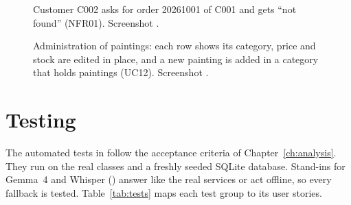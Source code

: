 \begin{figure}[htbp]
\centering
\begin{minipage}[t]{0.485\linewidth}\centering
{}
\caption[Checkout]{Checkout: address, payment method, VIP discount and shipping fee before the order is placed (UC07). Screenshot .}\label{fig:demo_checkout}
\end{minipage}\hfill
\begin{minipage}[t]{0.485\linewidth}\centering
{}
\caption[Order of another customer]{Customer C002 asks for order 20261001 of C001 and gets ``not found'' (NFR01). Screenshot .}\label{fig:demo_order_forbidden}
\end{minipage}
\end{figure}

\begin{figure}[htbp]
\centering
{}
\caption[Administration: products]{Administration of paintings: each row shows its category, price and stock are edited in place, and a new painting is added in a category that holds paintings (UC12). Screenshot .}\label{fig:demo_admin_products}
\end{figure}

\section{Testing}\label{sec:5.10}

The \testCount{} automated tests in  follow the acceptance criteria of
Chapter~\ref{ch:analysis}. They run on the real classes and a freshly seeded SQLite database. Stand-ins for Gemma~4 and
Whisper () answer like the real services or act offline, so every fallback is tested.
Table~\ref{tab:tests} maps each test group to its user stories.

